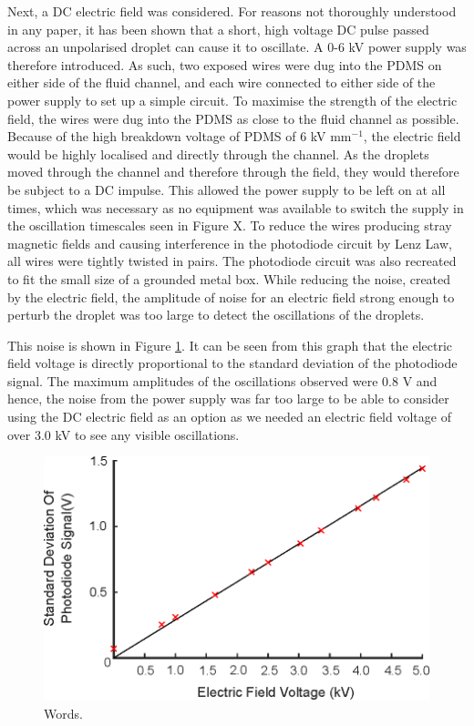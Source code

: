 \documentclass{physics_article_B}
\begin{document}
        Next, a DC electric field was considered. For reasons not thoroughly understood in any paper, it has been shown that a short, high voltage DC pulse passed across an unpolarised droplet can cause it to oscillate. A 0-6 kV power supply was therefore introduced. As such, two exposed wires were dug into the PDMS on either side of the fluid channel, and each wire connected to either side of the power supply to set up a simple circuit. To maximise the strength of the electric field, the wires were dug into the PDMS as close to the fluid channel as possible. Because of the high breakdown voltage of PDMS\cite{PDMSBreakdown} of 6 kV mm$^{-1}$, the electric field would be highly localised and directly through the channel. As the droplets moved through the channel and therefore through the field, they would therefore be subject to a DC impulse. This allowed the power supply to be left on at all times, which was necessary as no equipment was available to switch the supply in the oscillation timescales seen in Figure X. To reduce the wires producing stray magnetic fields and causing interference in the photodiode circuit by Lenz Law, all wires were tightly twisted in pairs. The photodiode circuit was also recreated to fit the small size of a grounded metal box. While reducing the noise, created by the electric field, the amplitude of noise for an electric field strong enough to perturb the droplet was too large to detect the oscillations of the droplets.
        
        This noise is shown in Figure \ref{fig:control}. It can be seen from this graph that the electric field voltage is directly proportional to the standard deviation of the photodiode signal. The maximum amplitudes of the oscillations observed were 0.8 V and hence, the noise from the power supply was far too large to be able to consider using the DC electric field as an option as we needed an electric field voltage of over 3.0 kV to see any visible oscillations. 
        
        
\begin{figure}[H]
\centering
\includegraphics{Figures/ElecFieldNoise.eps}
\captionsetup{justification=centering}
\caption{Words.} 	
\label{fig:control}
\end{figure} 
        
\end{document}
